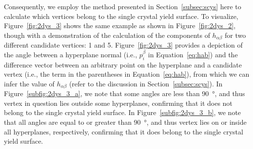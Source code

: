 \documentclass[preprint,3p,times,sort&compress,letterpaper,12pt]{elsarticle} %
\begin{document}
Consequently, we employ the method presented in Section~\ref{subsec:scys} here to calculate which vertices belong to the single crystal yield surface. To visualize, Figure~\ref{fig:2dys_3} shows the same example as shown in Figure~\ref{fig:2dys_2}, though with a demonstration of the calculation of the components of $h_{\alpha\beta}$ for two different candidate vertices: 1 and 5. Figure~\ref{fig:2dys_3} provides a depiction of the angle between a hyperplane normal (i.e., $p_i^\beta$ in Equation~\ref{eq:hab}) and the difference vector between an arbitrary point on the hyperplane and a candidate vertex (i.e., the term in the parentheses in Equation~\ref{eq:hab}), from which we can infer the value of $h_{\alpha\beta}$ (refer to the discussion in Section~\ref{subsec:scys}). In Figure~\ref{subfig:2dys_3_a}, we note that some angles are less than \SI{90}{\degree}, and thus vertex in question lies outside some hyperplanes, confirming that it does not belong to the single crystal yield surface. In Figure~\ref{subfig:2dys_3_b}, we note that all angles are equal to or greater than \SI{90}{\degree}, and thus vertex lies on or inside all hyperplanes, respectively, confirming that it does belong to the single crystal yield surface.
\end{document}
